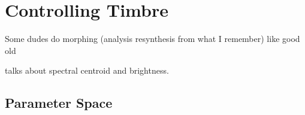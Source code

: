 \section{Controlling Timbre}
\label{sec:Timbre-Control}
	
	\note
	{
		Some dudes do morphing (analysis resynthesis from what I remember) like good old 
		\citet{williams2007perceptually, williams2009perceptually, williams2010perceptually}

		\citet{schubert2006does} talks about spectral centroid and brightness.
	}

	\subsection{Parameter Space}
	\label{sec:Timbre-ParameterSpaces}

